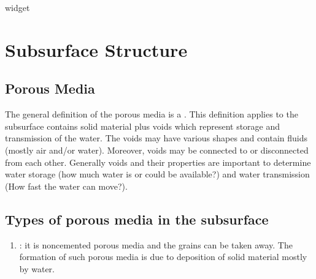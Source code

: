 \documentclass[letterpaper,10pt,english]{sphinxmanual}
\let\sphinxpxdimen\pdfpxdimen\else\newdimen\sphinxpxdimen
\begin{document}
\begin{sphinxVerbatim}[commandchars=\\\{\}]
   
   
   
   
 widget
  
\end{sphinxVerbatim}


\section{Subsurface Structure}
\label{\detokenize{contents/flow/12_subsurface_structure:subsurface-structure}}\label{\detokenize{contents/flow/12_subsurface_structure::doc}}

\subsection{Porous Media}
\label{\detokenize{contents/flow/12_subsurface_structure:porous-media}}
The general definition of the porous media is a . This definition applies to the subsurface contains solid material plus voids which represent storage and transmission of the water. The voids may have various shapes and contain fluids (mostly air and/or water). Moreover, voids may be connected to or disconnected from each other.
Generally voids and their properties are important to determine water storage (how much water is or could be available?) and water transmission (How fast the water can move?).


\subsection{Types of porous media in the subsurface}
\label{\detokenize{contents/flow/12_subsurface_structure:types-of-porous-media-in-the-subsurface}}
\noindent{\hspace*{\fill}\sphinxincludegraphics[height=400\sphinxpxdimen]{{L02_fig1}.png}\hspace*{\fill}}
\begin{enumerate}
%
\item {} 
: it is non\sphinxhyphen{}cemented porous media and the grains can be taken away. The formation of such porous media is due to deposition of solid material mostly by water.

\end{enumerate}
\end{document}
